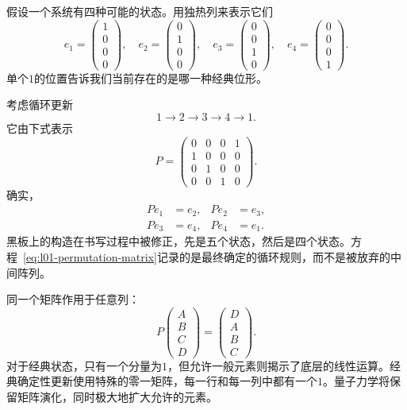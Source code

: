 假设一个系统有四种可能的状态。用独热列来表示它们
\begin{equation}
  e_1=
  \begin{pmatrix}1\\0\\0\\0\end{pmatrix},
  \quad
  e_2=
  \begin{pmatrix}0\\1\\0\\0\end{pmatrix},
  \quad
  e_3=
  \begin{pmatrix}0\\0\\1\\0\end{pmatrix},
  \quad
  e_4=
  \begin{pmatrix}0\\0\\0\\1\end{pmatrix}.
  \label{eq:l01-one-hot}
\end{equation}
单个\(1\)的位置告诉我们当前存在的是哪一种经典位形。

考虑循环更新
\begin{equation}
  1\longrightarrow2\longrightarrow3\longrightarrow4\longrightarrow1.
  \label{eq:l01-four-cycle}
\end{equation}
它由下式表示
\begin{equation}
  P=
  \begin{pmatrix}
    0&0&0&1\\
    1&0&0&0\\
    0&1&0&0\\
    0&0&1&0
  \end{pmatrix}.
  \label{eq:l01-permutation-matrix}
\end{equation}
确实，
\begin{equation}
  \begin{aligned}
    Pe_1&=e_2, & Pe_2&=e_3,\\
    Pe_3&=e_4, & Pe_4&=e_1.
  \end{aligned}
\end{equation}
黑板上的构造在书写过程中被修正，先是五个状态，然后是四个状态。方程~\eqref{eq:l01-permutation-matrix}记录的是最终确定的循环规则，而不是被放弃的中间阵列。

同一个矩阵作用于任意列：
\begin{equation}
  P
  \begin{pmatrix}A\\B\\C\\D\end{pmatrix}
  =
  \begin{pmatrix}D\\A\\B\\C\end{pmatrix}.
  \label{eq:l01-cyclic-shift}
\end{equation}
对于经典状态，只有一个分量为\(1\)，但允许一般元素则揭示了底层的线性运算。经典确定性更新使用特殊的零一矩阵，每一行和每一列中都有一个\(1\)。量子力学将保留矩阵演化，同时极大地扩大允许的元素。

